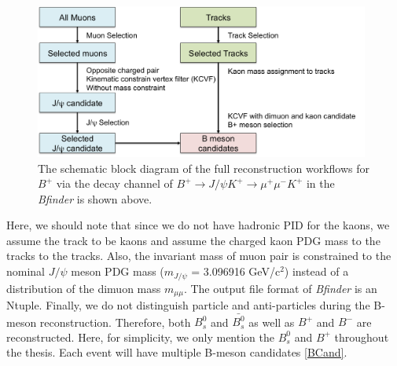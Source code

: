 \begin{figure}[h]
\begin{center}
\includegraphics[width= 0.98\textwidth]{Figures/Chapter4/BPmesonWorkflow.png}
\caption{The schematic block diagram of the full reconstruction workflows for $B^+$ via the decay channel of $B^+ \rightarrow J/\psi K^+ \rightarrow \mu^+\mu^- K^+$ in the \textit{Bfinder} is shown above.}
\label{BPRECOWF}
\end{center}
\end{figure}

Here, we should note that since we do not have hadronic PID for the kaons, we assume the track to be kaons and assume the charged kaon PDG mass to the tracks \cite{AlphaTheoEx} to the tracks. Also, the invariant mass of muon pair is constrained to the nominal $J/\psi$ meson PDG mass ($m_{J/\psi}$ = 3.096916 GeV/c$^2$) \cite{AlphaTheoEx} instead of a distribution of the dimuon mass $m_{\mu\mu}$. The output file format of \textit{Bfinder} is an Ntuple. Finally, we do not distinguish particle and anti-particles during the B-meson reconstruction. Therefore, both $B^0_s$ and $\bar{B^0_s}$ as well as $B^+$ and $B^-$ are reconstructed. Here, for simplicity, we only mention the $B^0_s$ and $B^+$ throughout the thesis. Each event will have multiple B-meson candidates \ref{BCand}.

